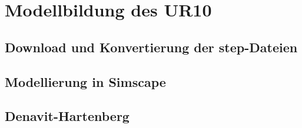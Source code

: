 \section{Modellbildung des UR10}


\subsection{Download und Konvertierung der step-Dateien}

\subsection{Modellierung in Simscape}

\subsection{Denavit-Hartenberg}